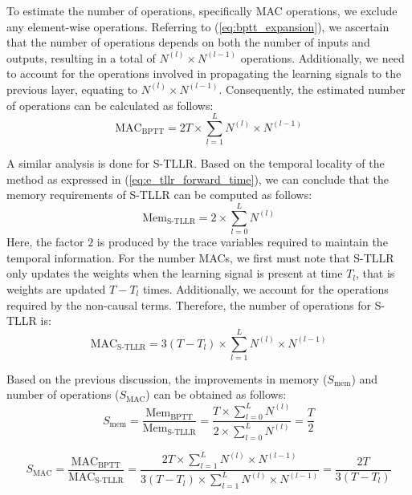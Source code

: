 \documentclass[10pt]{article} %
\begin{document}
    To estimate the number of operations, specifically MAC operations, we exclude any element-wise operations.
    Referring to (\ref{eq:bptt_expansion}), we ascertain that the number of operations depends on both the number of inputs and outputs, resulting in a total of $N^{(l)}\times N^{(l-1)}$ operations.
    Additionally, we need to account for the operations involved in propagating the learning signals to the previous layer, equating to $N^{(l)}\times N^{(l-1)}$.
    Consequently, the estimated number of operations can be calculated as follows:
    \begin{equation}
        \text{MAC}_{\text{BPTT}} = 2T\times \sum_{l=1}^L N^{(l)}\times N^{(l-1)}
    \end{equation}

    A similar analysis is done for S-TLLR. Based on the temporal locality of the method as expressed in (\ref{eq:e_tllr_forward_time}), we can conclude that the memory requirements of S-TLLR can be computed as follows:
    \begin{equation}
        \text{Mem}_{\text{S-TLLR}} = 2\times \sum_{l=0}^L N^{(l)}
        \label{eq:mem_stllr}
    \end{equation}
    Here, the factor $2$ is produced by the trace variables required to maintain the temporal information. 
    For the number MACs, we first must note that S-TLLR only updates the weights when the learning signal is present at time $T_l$, that is weights are updated $T-T_l$ times. Additionally, we account for the operations required by the non-causal terms.
    Therefore, the number of operations for S-TLLR is:
    \begin{equation}
        \text{MAC}_{\text{S-TLLR}} = 3(T-T_l)\times \sum_{l=1}^L N^{(l)}\times N^{(l-1)}
    \end{equation}
    
    Based on the previous discussion, the improvements in memory ($S_{\text{mem}}$) and number of operations ($S_{\text{MAC}}$) can be obtained as follows:
    \begin{equation}
        S_{\text{mem}} = \frac{\text{Mem}_{\text{BPTT}}}{\text{Mem}_{\text{S-TLLR}}} = \frac{T\times \sum_{l=0}^L N^{(l)}}{2\times \sum_{l=0}^L N^{(l)}} = \frac{T}{2}
    \end{equation}

    \begin{equation}
        S_{\text{MAC}} = \frac{\text{MAC}_{\text{BPTT}}}{\text{MAC}_{\text{S-TLLR}}} = \frac{2T\times \sum_{l=1}^L N^{(l)}\times N^{(l-1)}}{3(T-T_l)\times \sum_{l=1}^L N^{(l)}\times N^{(l-1)}} = \frac{2T}{3(T-T_l)}
    \end{equation}
    
\end{document}
